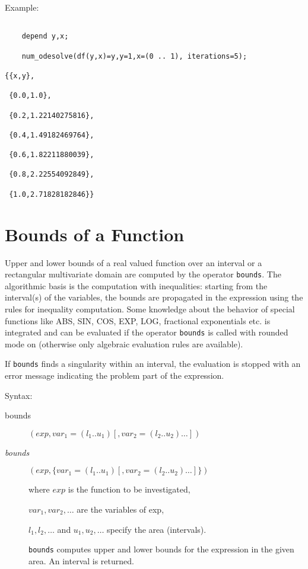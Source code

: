 Example:
\begin{verbatim}

    depend y,x;

    num_odesolve(df(y,x)=y,y=1,x=(0 .. 1), iterations=5);

{{x,y},

 {0.0,1.0},

 {0.2,1.22140275816},

 {0.4,1.49182469764},

 {0.6,1.82211880039},

 {0.8,2.22554092849},

 {1.0,2.71828182846}}

\end{verbatim}


\section{Bounds of a Function}
\hypertarget{operator:BOUNDS}{}

Upper and lower bounds of a real valued function over an
interval or a rectangular multivariate domain are computed
by the operator \texttt{bounds}. The algorithmic basis is the computation
with inequalities: starting from the interval(s) of the
variables, the bounds are propagated in the expression
using the rules for inequality computation. Some knowledge
about the behavior of special functions like ABS, SIN, COS, EXP, LOG,
fractional exponentials etc. is integrated and can be evaluated
if the operator \texttt{bounds} is called with rounded mode on
(otherwise only algebraic evaluation rules are available).

If \texttt{bounds} finds a singularity within an interval, the evaluation
is stopped with an error message indicating the problem part
of the expression.

Syntax:
\begin{description}
\item[bounds]$(exp,var_1=(l_1 .. u_1) [,var_2=(l_2 .. u_2) \ldots])$

\item[\textit{bounds}]$(exp,\{var_1=(l_1 .. u_1) [,var_2=(l_2 .. u_2)\ldots]\})$

where $exp$ is the function to be investigated,

$var_1, var_2 , \ldots$ are the variables of exp,

$l_1, l_2 , \ldots$  and  $u_1, u_2 , \ldots$ specify the area (intervals).

\texttt{bounds} computes upper and lower bounds for the expression in the
given area. An interval is returned.

\end{description}

